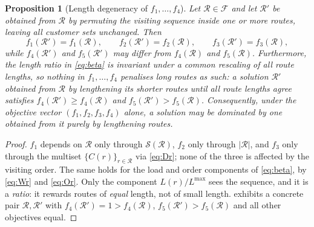 \documentclass[11pt,a4paper]{article}
\theoremstyle{definition}
\theoremstyle{plain}
\newtheorem{proposition}[definition]{Proposition}
\newcommand{\Feas}{\mathcal{F}}
\newcommand{\Routes}{\mathcal{R}}
\newcommand{\Ground}{\mathcal{S}}
\newcommand{\Lmax}{L^{\max}}
\begin{document}
\begin{proposition}[Length degeneracy of $f_1,\dots,f_4$]
\label{prop:degeneracy}
Let $\Routes \in \Feas$ and let $\Routes'$ be obtained from $\Routes$ by
permuting the visiting sequence inside one or more routes, leaving all customer
sets unchanged.  Then
\begin{equation}
  f_1(\Routes') = f_1(\Routes), \qquad
  f_2(\Routes') = f_2(\Routes), \qquad
  f_3(\Routes') = f_3(\Routes),
\end{equation}
while $f_4(\Routes')$ and $f_5(\Routes')$ may differ from $f_4(\Routes)$ and
$f_5(\Routes)$.  Furthermore, the length ratio in \eqref{eq:beta} is invariant
under a common rescaling of all route lengths, so nothing in $f_1,\dots,f_4$
penalises long routes as such: a solution $\Routes'$ obtained from $\Routes$ by
lengthening its shorter routes until all route lengths agree satisfies
$f_4(\Routes') \ge f_4(\Routes)$ and $f_5(\Routes') > f_5(\Routes)$.
Consequently, under the objective vector
$(f_1,f_2,f_3,f_4)$ alone, a solution may be dominated by one obtained from it
purely by \emph{lengthening} routes.
\end{proposition}

\begin{proof}
$f_1$ depends on $\Routes$ only through $\Ground(\Routes)$, $f_2$ only through
$|\Routes|$, and $f_3$ only through the multiset $\{C(r)\}_{r\in\Routes}$ via
\eqref{eq:Dr}; none of the three is affected by the visiting order.  The same
holds for the load and order components of \eqref{eq:beta}, by \eqref{eq:Wr}
and \eqref{eq:Or}.  Only the component $L(r)/\Lmax$ sees the sequence, and it
is a \emph{ratio}: it rewards routes of \emph{equal} length, not of small
length.   exhibits a concrete pair $\Routes, \Routes'$ with
$f_4(\Routes') = 1 > f_4(\Routes)$, $f_5(\Routes') > f_5(\Routes)$ and all
other objectives equal.
\end{proof}
\end{document}
